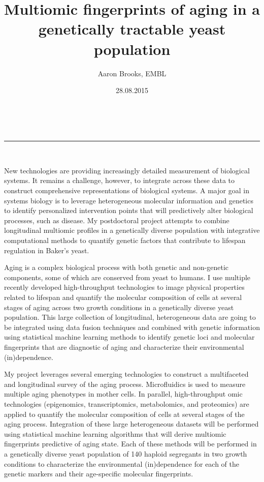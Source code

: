 \documentclass[a4paper,10pt,sans]{article}
\makeatletter
\newcommand{\linia}{\rule{\linewidth}{0.5pt}}
\renewcommand{\maketitle}{
\begin{center}
\vspace{2ex}
{\huge \textsc{\@title}}
\vspace{1ex}
\\
\linia\\
\@author \hfill \@date
\vspace{2ex}
\end{center}
}
\makeatother
\begin{document}
\title{Multiomic fingerprints of aging in a genetically tractable yeast population}

\author{Aaron Brooks, EMBL}

\date{28.08.2015}

\maketitle

New technologies are providing increasingly detailed measurement of biological systems. It remains a challenge, however, to integrate across these data to construct comprehensive representations of biological systems. A major goal in systems biology is to leverage heterogeneous molecular information and genetics to identify personalized intervention points that will predictively alter biological processes, such as disease. My postdoctoral project attempts to combine longitudinal multiomic profiles in a genetically diverse population with integrative computational methods to quantify genetic factors that contribute to lifespan regulation in Baker's yeast.

Aging is a complex biological process with both genetic and non-genetic components, some of which are conserved from yeast to humans. I use multiple recently developed high-throughput technologies to image physical properties related to lifespan and quantify the molecular composition of cells at several stages of aging across two growth conditions in a genetically diverse yeast population. This large collection of longitudinal, heterogeneous data are going to be integrated using data fusion techniques and combined with genetic information using statistical machine learning methods to identify genetic loci and molecular fingerprints that are diagnostic of aging and characterize their environmental (in)dependence.

My project leverages several emerging technologies to construct a multifaceted and longitudinal survey of the aging process. Microfluidics is used to measure multiple aging phenotypes in mother cells. In parallel, high-throughput omic technologies (epigenomics, transcriptomics, metabolomics, and proteomics) are applied to quantify the molecular composition of cells at several stages of the aging process. Integration of these large heterogeneous datasets will be performed using statistical machine learning algorithms that will derive multiomic fingerprints predictive of aging state. Each of these methods will be performed in a genetically diverse yeast population of 140 haploid segregants in two growth conditions to characterize the environmental (in)dependence for each of the genetic markers and their age-specific molecular fingerprints.
\end{document}
